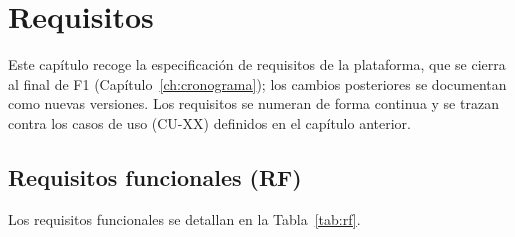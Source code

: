
\chapter{Requisitos}
\label{ch:requisitos}

Este capítulo recoge la especificación de requisitos de la plataforma, que se cierra al final de F1 (Capítulo~\ref{ch:cronograma}); los cambios posteriores se documentan como nuevas versiones. Los requisitos se numeran de forma continua y se trazan contra los casos de uso (CU-XX) definidos en el capítulo anterior.

\section{Requisitos funcionales (RF)}
\label{sec:rf}

Los requisitos funcionales se detallan en la Tabla~\ref{tab:rf}.

